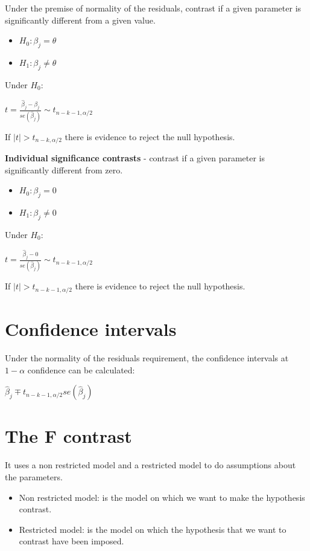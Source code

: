 \documentclass[10pt,landscape]{article}
\begin{document}
\begin{multicols}{3}
Under the premise of normality of the residuals, contrast if a given parameter is significantly different from a given value.

\begin{itemize}[leftmargin=*]
\item $H_0: \beta_j = \theta$
\item $H_1: \beta_j \neq \theta$
\end{itemize}

Under $H_0$:

$t = \frac{\hat{\beta}_j - \beta_j}{se(\hat{\beta}_j)} \sim t_{n-k-1, \alpha/2}$

If $\mid t \mid > t_{n-k, \alpha/2}$ there is evidence to reject the null hypothesis.

\textbf{Individual significance contrasts} - contrast if a given parameter is significantly different from zero.

\begin{itemize}[leftmargin=*]
\item $H_0: \beta_j = 0$
\item $H_1: \beta_j \neq 0$
\end{itemize}

Under $H_0$:

$t = \frac{\hat{\beta}_j - 0}{se(\hat{\beta}_j)} \sim t_{n-k-1, \alpha/2}$

If $\mid t \mid > t_{n-k-1, \alpha/2}$ there is evidence to reject the null hypothesis.

\section*{Confidence intervals}

Under the normality of the residuals requirement, the confidence intervals at $1 - \alpha$ confidence can be calculated:

$\hat{\beta}_j \mp t_{n-k-1, \alpha/2} se(\hat{\beta}_j)$

\section*{The F contrast}

It uses a non restricted model and a restricted model to do assumptions about the parameters.

\begin{itemize}[leftmargin=*]
\item Non restricted model: is the model on which we want to make the hypothesis contrast.
\item Restricted model: is the model on which the hypothesis that we want to contrast have been imposed.
\end{itemize}


\end{multicols}
\end{document}
